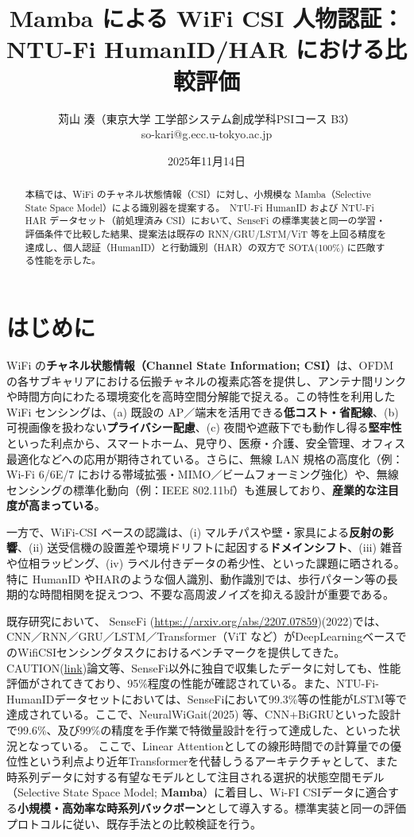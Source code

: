 \documentclass[11pt]{ltjsarticle}
\title{Mamba による WiFi CSI 人物認証：NTU-Fi HumanID/HAR における比較評価}
\author{苅山 湊（東京大学 工学部システム創成学科PSIコース B3）\\so-kari@g.ecc.u-tokyo.ac.jp}
\date{2025年11月14日}
\begin{document}
\maketitle
\begin{abstract}
本稿では、WiFi のチャネル状態情報（CSI）に対し、小規模な Mamba（Selective State Space Model）による識別器を提案する。\
NTU-Fi HumanID および NTU-Fi HAR データセット（前処理済み CSI）において、SenseFi の標準実装と同一の学習・評価条件で比較した結果、提案法は既存の RNN/GRU/LSTM/ViT 等を上回る精度を達成し、個人認証（HumanID）と行動識別（HAR）の双方で SOTA(100\%) に匹敵する性能を示した。
\end{abstract}

\section{はじめに}

WiFi の\textbf{チャネル状態情報（Channel State Information; CSI）}は、OFDM の各サブキャリアにおける伝搬チャネルの複素応答を提供し、アンテナ間リンクや時間方向にわたる環境変化を高時空間分解能で捉える。この特性を利用した WiFi センシングは、(a) 既設の AP／端末を活用できる\textbf{低コスト・省配線}、(b) 可視画像を扱わない\textbf{プライバシー配慮}、(c) 夜間や遮蔽下でも動作し得る\textbf{堅牢性} といった利点から、スマートホーム、見守り、医療・介護、安全管理、オフィス最適化などへの応用が期待されている。さらに、無線 LAN 規格の高度化（例：Wi-Fi 6/6E/7 における帯域拡張・MIMO／ビームフォーミング強化）や、無線センシングの標準化動向（例：IEEE 802.11bf）も進展しており、\textbf{産業的な注目度が高まっている}。

一方で、WiFi-CSI ベースの認識は、(i) マルチパスや壁・家具による\textbf{反射の影響}、(ii) 送受信機の設置差や環境ドリフトに起因する\textbf{ドメインシフト}、(iii) 雑音や位相ラッピング、(iv) ラベル付きデータの希少性、といった課題に晒される。特に HumanID やHARのような個人識別、動作識別では、歩行パターン等の長期的な時間相関を捉えつつ、不要な高周波ノイズを抑える設計が重要である。

既存研究において、 SenseFi (\href{https://arxiv.org/abs/2207.07859}{https://arxiv.org/abs/2207.07859})(2022)では、CNN／RNN／GRU／LSTM／Transformer（ViT など）がDeepLearningベースでのWifiCSIセンシングタスクにおけるベンチマークを提供してきた。CAUTION(\href{https://www.researchgate.net/publication/359009301_CAUTION_A_Robust_WiFi-based_Human_Authentication_System_via_Few-shot_Open-set_Gait_Recognition}{link})論文等、SenseFi以外に独自で収集したデータに対しても、性能評価がされてきており、95\%程度の性能が確認されている。また、NTU-Fi-HumanIDデータセットにおいては、SenseFiにおいて99.3\%等の性能がLSTM等で達成されている。ここで、NeuralWiGait(2025) 等、CNN+BiGRUといった設計で99.6\%、及び99\%の精度を手作業で特徴量設計を行って達成した、といった状況となっている。
ここで、Linear Attentionとしての線形時間での計算量での優位性という利点より近年Transformerを代替しうるアーキテクチャとして、また時系列データに対する有望なモデルとして注目される選択的状態空間モデル（Selective State Space Model; \textbf{Mamba}）に着目し、Wi-FI CSIデータに適合する\textbf{小規模・高効率な時系列バックボーン}として導入する。標準実装と同一の評価プロトコルに従い、既存手法との比較検証を行う。
\end{document}

